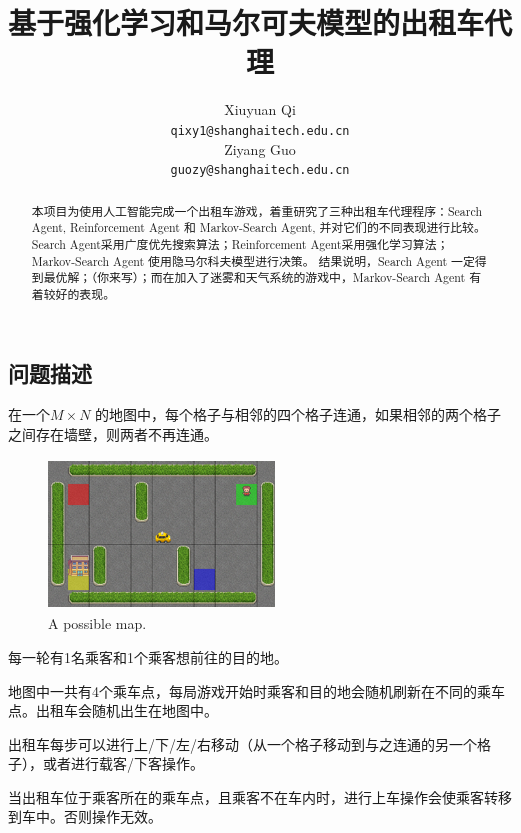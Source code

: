 \documentclass{article}
\title{基于强化学习和马尔可夫模型的出租车代理}
\author{
  Xiuyuan Qi \\
  \texttt{qixy1@shanghaitech.edu.cn} \\
  \And
  Ziyang Guo \\
  \texttt{guozy@shanghaitech.edu.cn} \\
}
\begin{document}
\begin{CJK}{UTF8}{gbsn}


\maketitle


\begin{abstract} 
  本项目为使用人工智能完成一个出租车游戏，着重研究了三种出租车代理程序：Search Agent, Reinforcement Agent 和 Markov-Search Agent, 
  并对它们的不同表现进行比较。
  Search Agent采用广度优先搜索算法；Reinforcement Agent采用强化学习算法；Markov-Search Agent 使用隐马尔科夫模型进行决策。
  结果说明，Search Agent 一定得到最优解；（你来写）；而在加入了迷雾和天气系统的游戏中，Markov-Search Agent 有着较好的表现。
\end{abstract}


\section{问题描述}
在一个$M\times N$ 的地图中，每个格子与相邻的四个格子连通，如果相邻的两个格子之间存在墙壁，则两者不再连通。

\begin{figure}[htbp]
  \centering
  \includegraphics[width=6cm,height=4cm]{images/map.png}
  \caption{A possible map.}
\end{figure}
每一轮有1名乘客和1个乘客想前往的目的地。

​地图中一共有4个乘车点，每局游戏开始时乘客和目的地会随机刷新在不同的乘车点。出租车会随机出生在地图中。 

出租车每步可以进行上/下/左/右移动（从一个格子移动到与之连通的另一个格子），或者进行载客/下客操作。 

当出租车位于乘客所在的乘车点，且乘客不在车内时，进行上车操作会使乘客转移到车中。否则操作无效。 


\end{CJK}
\end{document}
